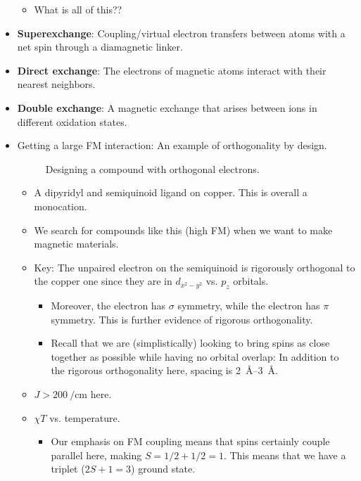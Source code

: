 \documentclass[../notes.tex]{subfiles}
\begin{document}
\begin{itemize}
\begin{itemize}
        \item What is all of this??
    \end{itemize}
    \item \textbf{Superexchange}: Coupling/virtual electron transfers between atoms with a net spin through a diamagnetic linker.
    \item \textbf{Direct exchange}: The electrons of magnetic atoms interact with their nearest neighbors.
    \item \textbf{Double exchange}: A magnetic exchange that arises between ions in different oxidation states.
    \item Getting a large FM interaction: An example of orthogonality by design.
    \begin{figure}[H]
        \centering
        \footnotesize
        \chemleft{[}
        \chemright{]^+}
        \caption{Designing a compound with orthogonal electrons.}
        \label{fig:orthogonalElectrons}
    \end{figure}
    \begin{itemize}
        \item A dipyridyl and semiquinoid ligand on copper. This is overall a monocation.
        \item We search for compounds like this (high FM) when we want to make magnetic materials.
        \item Key: The unpaired electron on the semiquinoid is rigorously orthogonal to the copper one since they are in $d_{x^2-y^2}$ vs. $p_z$ orbitals.
        \begin{itemize}
            \item Moreover, the  electron has $\sigma$ symmetry, while the  electron has $\pi$ symmetry. This is further evidence of rigorous orthogonality.
            \item Recall that we are (simplistically) looking to bring spins as close together as possible while having no orbital overlap: In addition to the rigorous orthogonality here, spacing is \SIrange{2}{3}{\angstrom}.
        \end{itemize}
        \item $J>\SI{200}{\per\centi\meter}$ here.
        \item $\chi T$ vs. temperature.
        \begin{itemize}
            \item Our emphasis on FM coupling means that spins certainly couple parallel here, making $S=1/2+1/2=1$. This means that we have a triplet ($2S+1=3$) ground state.

\end{itemize}
\end{itemize}
\end{itemize}
\end{document}
